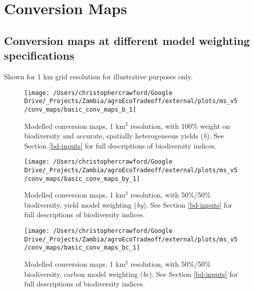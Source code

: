 \documentclass[
]{article}
\begin{document}
\hypertarget{conv-maps}{%
\section{Conversion Maps}\label{conv-maps}}

\hypertarget{conversion-maps-at-different-model-weighting-specifications}{%
\subsection{Conversion maps at different model weighting specifications}\label{conversion-maps-at-different-model-weighting-specifications}}

Shown for 1 km grid resolution for illustrative purposes only.













\begin{figure}
\texttt{[image: /Users/christophercrawford/Google Drive/\_Projects/Zambia/agroEcoTradeoff/external/plots/ms\_v5/conv\_maps/basic\_conv\_maps\_b\_1]} \caption{Modelled conversion maps, 1 km\(^2\) resolution, with 100\% weight on biodiversity and accurate, spatially heterogeneous yields (\emph{b}). See Section \ref{bd-inputs} for full descriptions of biodiversity indices.}\label{fig:conv-maps-1-b}
\end{figure}

\begin{figure}
\texttt{[image: /Users/christophercrawford/Google Drive/\_Projects/Zambia/agroEcoTradeoff/external/plots/ms\_v5/conv\_maps/basic\_conv\_maps\_by\_1]} \caption{Modelled conversion maps, 1 km\(^2\) resolution, with 50\%/50\% biodiversity, yield model weighting (\emph{by}). See Section \ref{bd-inputs} for full descriptions of biodiversity indices.}\label{fig:conv-maps-1-by}
\end{figure}

\begin{figure}
\texttt{[image: /Users/christophercrawford/Google Drive/\_Projects/Zambia/agroEcoTradeoff/external/plots/ms\_v5/conv\_maps/basic\_conv\_maps\_bc\_1]} \caption{Modelled conversion maps, 1 km\(^2\) resolution, with 50\%/50\% biodiversity, carbon model weighting (\emph{bc}). See Section \ref{bd-inputs} for full descriptions of biodiversity indices.}\label{fig:conv-maps-1-bc}
\end{figure}
\end{document}
